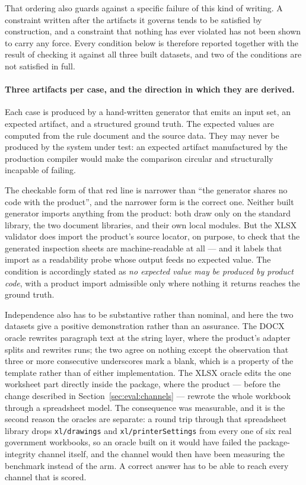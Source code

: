That ordering also guards against a specific failure of this kind of writing. A constraint
written after the artifacts it governs tends to be satisfied by construction, and a constraint
that nothing has ever violated has not been shown to carry any force. Every condition below is
therefore reported together with the result of checking it against all three built datasets,
and two of the conditions are not satisfied in full.

\paragraph{Three artifacts per case, and the direction in which they are derived.}
Each case is produced by a hand-written generator that emits an input set, an expected
artifact, and a structured ground truth. The expected values are computed from the rule
document and the source data. They may never be produced by the system under test: an expected
artifact manufactured by the production compiler would make the comparison circular and
structurally incapable of failing.

The checkable form of that red line is narrower than ``the generator shares no code with the
product'', and the narrower form is the correct one. Neither built generator imports anything
from the product: both draw only on the standard library, the two document libraries, and
their own local modules. But the XLSX validator does import the product's source locator, on
purpose, to check that the generated inspection sheets are machine-readable at all --- and it
labels that import as a readability probe whose output feeds no expected value. The condition
is accordingly stated as \emph{no expected value may be produced by product code}, with a
product import admissible only where nothing it returns reaches the ground truth.

Independence also has to be substantive rather than nominal, and here the two datasets give a
positive demonstration rather than an assurance. The DOCX oracle rewrites paragraph text at the
string layer, where the product's adapter splits and rewrites runs; the two agree on nothing
except the observation that three or more consecutive underscores mark a blank, which is a
property of the template rather than of either implementation. The XLSX oracle edits the one
worksheet part directly inside the package, where the product --- before the change described
in Section~\ref{sec:eval:channels} --- rewrote the whole workbook through a spreadsheet model.
The consequence was measurable, and it is the second reason the oracles are separate: a
round trip through that spreadsheet library drops \texttt{xl/drawings} and
\texttt{xl/printerSettings} from every one of six real government workbooks, so an oracle built
on it would have failed the package-integrity channel itself, and the channel would then have
been measuring the benchmark instead of the arm. A correct answer has to be able to reach every
channel that is scored.

